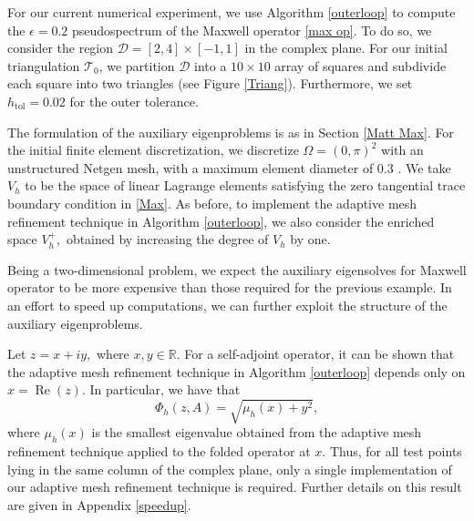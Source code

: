 For our current numerical experiment, we use Algorithm \ref{outerloop} to compute the $\epsilon = 0.2$ pseudospectrum of the Maxwell operator \eqref{max op}. To do so,
we consider the region $\mathcal{D} = [2, 4] \times [-1, 1]$ in the complex plane. For our initial triangulation $\mathcal{T}_0$, we partition $\mathcal{D}$ into a $10 \times 10$ array of squares and subdivide each square into two triangles (see Figure \ref{Triang}). Furthermore, we set $h_{\text{tol}} = 0.02$ for the outer tolerance. 

The formulation of the auxiliary eigenproblems is as in Section \ref{Matt Max}. For the initial finite element discretization, we discretize $\Omega = (0, \pi)^2$ with an unstructured Netgen mesh, with a maximum element diameter of $0.3$ \cite{Schoberl1997}. We take $V_h$ to be the space of linear Lagrange elements satisfying the zero tangential trace boundary condition in \eqref{Max}.
As before, to implement the adaptive mesh refinement technique in Algorithm \ref{outerloop}, we also consider the enriched space $V_h^+,$ obtained by increasing the degree of $V_h$ by one.

Being a two-dimensional problem, we expect the auxiliary eigensolves for Maxwell operator to be more expensive than those required for the previous example. In an effort to speed up computations, we can further exploit the structure of the auxiliary eigenproblems. 


Let $z = x + iy,$ where $x, y \in \mathbb{R}.$ For a self-adjoint operator, it can be shown that the adaptive mesh refinement technique in Algorithm \ref{outerloop} depends only on $x = \operatorname{Re}(z).$ In particular, we have that 
\begin{equation}
    \Phi_h(z, A) = \sqrt{\mu_h(x) + y^2},
\end{equation}
where $\mu_h(x)$ is the smallest eigenvalue obtained from the adaptive mesh refinement technique applied to the folded operator at $x.$ Thus, for all test points lying in the same column of the complex plane, only a single implementation of our adaptive mesh refinement technique is required. Further details on this result are given in Appendix \ref{speedup}.


